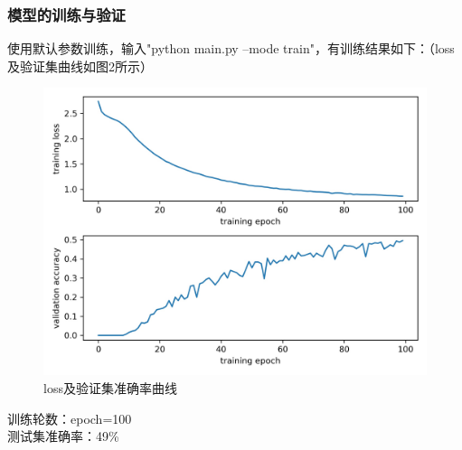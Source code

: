\documentclass[a4paper]{article}
\begin{document}
\subsubsection{模型的训练与验证}
使用默认参数训练，输入"python main.py --mode train"，有训练结果如下：（loss及验证集曲线如图2所示）\\
\begin{figure}
    \centering
    \includegraphics[width=12cm]{loss_and_accuracy.jpg}
    \caption{loss及验证集准确率曲线}
\end{figure}
训练轮数：epoch=100 \\
测试集准确率：49\% \\
\end{document}
